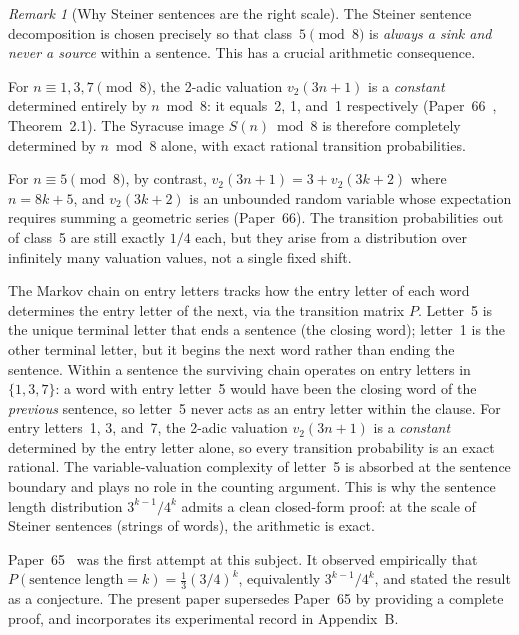 \documentclass[12pt]{article}
\theoremstyle{definition}
\theoremstyle{remark}
\newtheorem{remark}[theorem]{Remark}
\newcommand{\vt}{v_2}
\newcommand{\Sm}{S}
\begin{document}
\begin{remark}[Why Steiner sentences are the right scale]
\label{rem:scale}
The Steiner sentence decomposition is chosen precisely so that class~$5 \pmod 8$
is \emph{always a sink and never a source} within a sentence.
This has a crucial arithmetic consequence.

For $n \equiv 1, 3, 7 \pmod 8$, the 2-adic valuation $\vt(3n+1)$ is a
\emph{constant} determined entirely by $n \bmod 8$: it equals~2, 1, and~1
respectively (Paper~66~\cite{paper66}, Theorem~2.1).
The Syracuse image $\Sm(n) \bmod 8$ is therefore completely determined by
$n \bmod 8$ alone, with exact rational transition probabilities.

For $n \equiv 5 \pmod 8$, by contrast, $\vt(3n+1) = 3 + \vt(3k+2)$ where
$n = 8k+5$, and $\vt(3k+2)$ is an unbounded random variable whose
expectation requires summing a geometric series (Paper~66).
The transition probabilities out of class~5 are still exactly $1/4$ each,
but they arise from a distribution over infinitely many valuation values,
not a single fixed shift.

The Markov chain on entry letters tracks how the entry letter of each word
determines the entry letter of the next, via the transition matrix $P$.
Letter~5 is the unique terminal letter that ends a sentence (the closing
word); letter~1 is the other terminal letter, but it begins the next word
rather than ending the sentence.
Within a sentence the surviving chain operates on entry letters in $\{1,3,7\}$:
a word with entry letter~5 would have been the closing word of the \emph{previous}
sentence, so letter~5 never acts as an entry letter within the clause.
For entry letters~1, 3, and~7, the 2-adic valuation $\vt(3n+1)$ is a
\emph{constant} determined by the entry letter alone, so every transition
probability is an exact rational.
The variable-valuation complexity of letter~5 is absorbed at the sentence
boundary and plays no role in the counting argument.
This is why the sentence length distribution $3^{k-1}/4^k$ admits a
clean closed-form proof: at the scale of Steiner sentences (strings of words),
the arithmetic is exact.
\end{remark}

Paper~65~\cite{paper65} was the first attempt at this subject.
It observed empirically that
$P(\text{sentence length} = k) = \frac{1}{3}(3/4)^k$,
equivalently $3^{k-1}/4^k$, and stated the result as a conjecture.
The present paper supersedes Paper~65 by providing a complete proof,
and incorporates its experimental record in Appendix~B.
\end{document}
